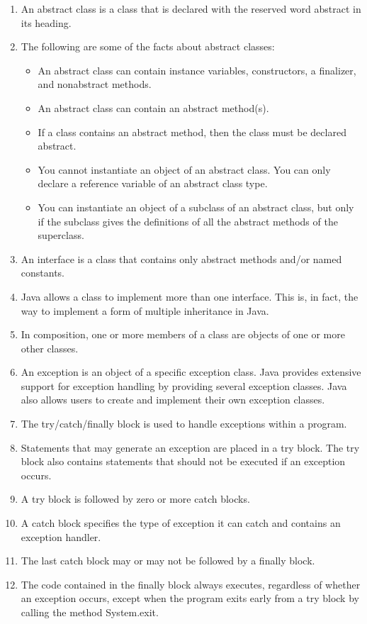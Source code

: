 \documentclass[12pt,a4paper,final,twoside,onecolumn,titlepage]{book}
\begin{document}
\begin{enumerate}
\item An abstract class is a class that is declared with the reserved word abstract in its heading.
\item The following are some of the facts about abstract classes:
\begin{itemize}
\item An abstract class can contain instance variables, constructors, a finalizer, and nonabstract methods.
\item An abstract class can contain an abstract method(s).
\item If a class contains an abstract method, then the class must be declared abstract.
\item You cannot instantiate an object of an abstract class. You can only declare a reference variable of an abstract class type.
\item You can instantiate an object of a subclass of an abstract class, but only if the subclass gives the definitions of all the abstract methods of the superclass.
\end{itemize}
\item An interface is a class that contains only abstract methods and/or named constants.
\item  Java allows a class to implement more than one interface. This is, in fact, the way to implement a form of multiple inheritance in Java.
\item In composition, one or more members of a class are objects of one or more other classes.
\item An exception is an object of a specific exception class. Java provides extensive support for exception handling by providing several exception classes. Java also allows users to create and implement their own exception classes.
\item The try/catch/finally block is used to handle exceptions within a program.
\item Statements that may generate an exception are placed in a try block. The try block also contains statements that should not be executed if an exception occurs.
\item A try block is followed by zero or more catch blocks.
\item A catch block specifies the type of exception it can catch and contains an exception handler.
\item The last catch block may or may not be followed by a finally block.
\item The code contained in the finally block always executes, regardless of whether an exception occurs, except when the program exits early from a try block by calling the method System.exit.

\end{enumerate}
\end{document}
